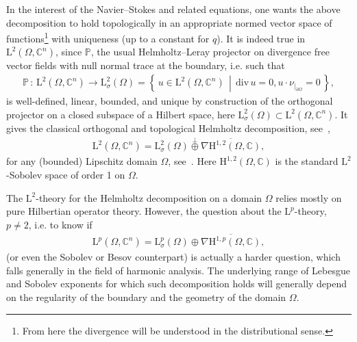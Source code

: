\documentclass[10pt]{amsart}
\theoremstyle{definition}\newtheorem{defi}[theo]{Definition}\newtheorem{rema}[theo]{Remark}\newtheorem{exam}[theo]{Example}\newtheorem{exem}[theo]{Example}\newtheorem{nota}[theo]{Notation}
\renewcommand*{\div}{\mathrm{div\,}}
\newcommand{\bbP}{\mathbb{P}}
\newcommand{\bbC}{\mathbb{C}}
\newcommand{\rmH}{\mathrm{H}}%
\newcommand{\rmL}{\mathrm{L}}
\begin{document}
In the interest of the Navier--Stokes and related equations, one wants the above decomposition to hold topologically in an appropriate normed vector space of functions\footnote{From here the divergence will be understood in the distributional sense.} with uniqueness (up to a constant for $q$). It is indeed true in $\rmL^2(\Omega,\bbC^n)$, since $\bbP$, the usual Helmholtz--Leray projector on divergence free vector fields with null normal trace at the boundary, i.e. such that
\begin{align*}
\bbP\,:\, \rmL^2\left(\Omega,\bbC^n\right) \longrightarrow \rmL^2_{\sigma}(\Omega)=
\left\{\, u\in \rmL^2\left(\Omega,\bbC^n\right)\,\middle|\, \div u = 0, u\cdot\nu_{|_{\partial\Omega}} =0\,\right\},
\end{align*}
is well-defined, linear, bounded, and unique by construction of the orthogonal projector on a closed subspace of a Hilbert space, here $\rmL^2_{\sigma}(\Omega)\subset\rmL^2(\Omega,\bbC^n)$. It gives the classical orthogonal and topological Helmholtz decomposition, see~\cite[Chapter~2,~Section~2.5]{SohrBook2001},
\begin{align*}
\rmL^2\left(\Omega,\bbC^n\right)= \rmL^2_{\sigma}(\Omega)\overset{\perp}{\oplus}\overline{\nabla {\rmH^{1,2}(\Omega,\bbC)}},
\end{align*}
for any (bounded) Lipschitz domain $\Omega$, see~\cite[Lemma~2.5.3]{SohrBook2001}. Here $\rmH^{1,2}(\Omega,\bbC)$ is the standard $\rmL^2$-Sobolev space of order 1 on $\Omega$.

The $\rmL^2$-theory for the Helmholtz decomposition on a domain $\Omega$ relies mostly on pure Hilbertian operator theory. However, the question about the $\rmL^p$-theory, $p\neq 2$, i.e. to know if
\begin{align}\label{HodgeDecompLpIntro}
\rmL^p\left(\Omega,\bbC^n\right)= \rmL^p_{\sigma}(\Omega){\oplus}\overline{\nabla {\rmH}^{1,p}(\Omega,\bbC)},
\end{align}
(or even the Sobolev or Besov counterpart) is actually a harder question, which falls generally in the field of harmonic analysis. The underlying range of Lebesgue and Sobolev exponents for which such decomposition holds will generally depend on the regularity of the boundary and the geometry of the domain $\Omega$.
\end{document}
